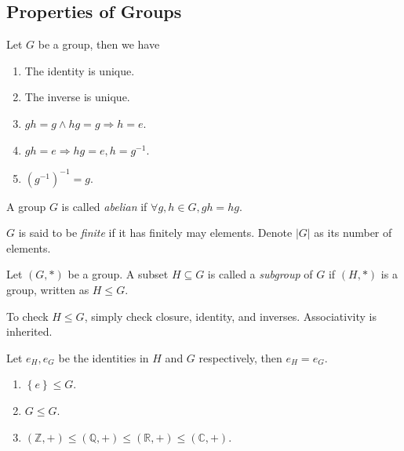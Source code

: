 \documentclass[a4paper]{article}
\begin{document}
    \subsection{Properties of Groups}
    \begin{proposition}\label{prop:groups_properties}
        Let $G$ be a group, then we have 
        \begin{enumerate}
            \item The identity is unique.
            \item The inverse is unique.
            \item $ gh=g \land hg=g \Rightarrow h=e $.
            \item $ gh=e \Rightarrow hg=e, h=g^{-1} $.
            \item $ (g^{-1})^{-1}=g $.
        \end{enumerate}
    \end{proposition}
    \begin{definition}
        A group $G$ is called \textit{abelian} if $ \forall g,h\in G, gh=hg $.
    \end{definition}
    \begin{definition}
        $G$ is said to be \textit{finite} if it has finitely may elements. Denote $|G|$ as its number of elements.
    \end{definition}
    \begin{definition}
        Let $ (G,*) $ be a group. A subset $H\subseteq G$ is called a \textit{subgroup} of $G$ if $ (H,*) $ is a group, written as $ H\le G $.
    \end{definition}
    \begin{remark}
        To check $ H\le G $, simply check closure, identity, and inverses. Associativity is inherited.
    \end{remark}
    \begin{proposition}\label{prop:uniqueness of identity}
        Let $ e_H, e_G $ be the identities in $H$ and $G$ respectively, then $e_H=e_G$. 
    \end{proposition}
    \begin{example}
        \begin{enumerate}[(1)]
            \item $ \left\{ e\right\} \le G $.
            \item $ G\le G $.
            \item $ (\mathbb{Z} ,+)\le (\mathbb{Q} ,+)\le (\mathbb{R} ,+)\le (\mathbb{C} ,+) $.
        \end{enumerate}
    \end{example}
\end{document}

